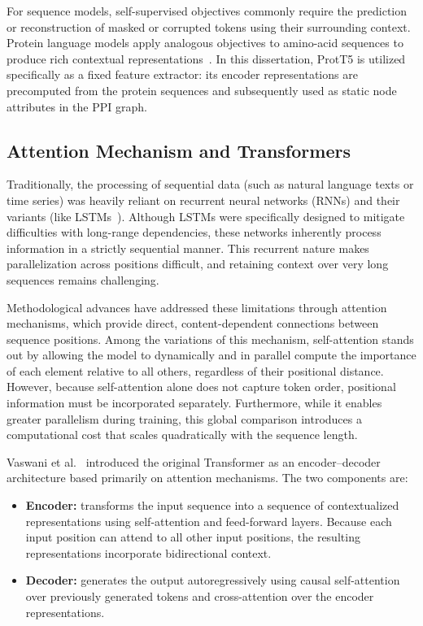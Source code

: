 \documentclass[Ingles]{ic-tese-v3}
\begin{document}
For sequence models, self-supervised objectives commonly require the prediction or reconstruction of masked or corrupted tokens using their surrounding context. Protein language models apply analogous objectives to amino-acid sequences to produce rich contextual representations~\cite{elnaggar2021prottrans}. In this dissertation, ProtT5 is utilized specifically as a fixed feature extractor: its encoder representations are precomputed from the protein sequences and subsequently used as static node attributes in the PPI graph.

\subsection{Attention Mechanism and Transformers}

Traditionally, the processing of sequential data (such as natural language texts or time series) was heavily reliant on recurrent neural networks (RNNs) and their variants (like LSTMs~\cite{hochreiter1997long}). Although LSTMs were specifically designed to mitigate difficulties with long-range dependencies, these networks inherently process information in a strictly sequential manner. This recurrent nature makes parallelization across positions difficult, and retaining context over very long sequences remains challenging.

Methodological advances have addressed these limitations through attention mechanisms, which provide direct, content-dependent connections between sequence positions. Among the variations of this mechanism, self-attention stands out by allowing the model to dynamically and in parallel compute the importance of each element relative to all others, regardless of their positional distance. However, because self-attention alone does not capture token order, positional information must be incorporated separately. Furthermore, while it enables greater parallelism during training, this global comparison introduces a computational cost that scales quadratically with the sequence length.

Vaswani et al.~\cite{vaswani2017attention} introduced the original Transformer as an encoder–decoder architecture based primarily on attention mechanisms. The two components are:
\begin{itemize}
    \item \textbf{Encoder:} transforms the input sequence into a sequence of contextualized representations using self-attention and feed-forward layers. Because each input position can attend to all other input positions, the resulting representations incorporate bidirectional context.
    \item \textbf{Decoder:} generates the output autoregressively using causal self-attention over previously generated tokens and cross-attention over the encoder representations.
\end{itemize}
\end{document}
